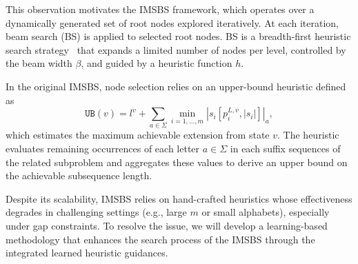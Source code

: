 \documentclass[runningheads]{llncs}
\begin{document}
This observation motivates the IMSBS framework, which operates over a dynamically generated set of root nodes explored iteratively. At each iteration, beam search (BS) is applied to selected root nodes. BS is a breadth-first heuristic search strategy~\cite{wiseman2016sequence} that expands a limited number of nodes per level, controlled by the beam width $\beta$, and guided by a heuristic function $h$.

In the original IMSBS, node selection relies on an upper-bound heuristic defined as
\[
\texttt{UB}(v)= l^v + \sum_{a \in \Sigma} \min_{i=1,\ldots,m} |s_i[p^{L,v}_i, |s_i|]|_a,
\]
which estimates the maximum achievable extension from state $v$. The heuristic evaluates remaining occurrences of each letter $a\in\Sigma$ in each  suffix sequences of the related subproblem and aggregates these values to derive an upper bound on the achievable subsequence length.

Despite its scalability, IMSBS relies on hand-crafted heuristics whose effectiveness degrades in challenging settings (e.g., large $m$ or small alphabets), especially under gap constraints. {To resolve the issue, we will develop a learning-based methodology that enhances the search process of the IMSBS through the integrated learned heuristic guidances. }
 
\end{document}
